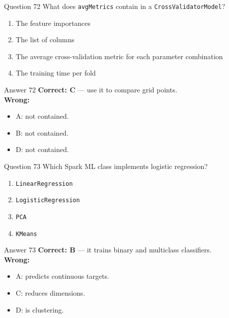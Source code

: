 \documentclass[aspectratio=169,11pt]{beamer}
\begin{document}
\begin{frame}{Question 72}
What does \texttt{avgMetrics} contain in a \texttt{CrossValidatorModel}?
\begin{enumerate}[label=\Alph*.]
\item The feature importances
\item The list of columns
\item The average cross-validation metric for each parameter combination
\item The training time per fold
\end{enumerate}
\end{frame}
\begin{frame}{Answer 72}
\textbf{Correct: C} --- use it to compare grid points.\\
\vspace{0.5em}
\textbf{Wrong:}
\begin{itemize}
\item A: not contained.
\item B: not contained.
\item D: not contained.
\end{itemize}
\end{frame}

\begin{frame}{Question 73}
Which Spark ML class implements logistic regression?
\begin{enumerate}[label=\Alph*.]
\item \texttt{LinearRegression}
\item \texttt{LogisticRegression}
\item \texttt{PCA}
\item \texttt{KMeans}
\end{enumerate}
\end{frame}
\begin{frame}{Answer 73}
\textbf{Correct: B} --- it trains binary and multiclass classifiers.\\
\vspace{0.5em}
\textbf{Wrong:}
\begin{itemize}
\item A: predicts continuous targets.
\item C: reduces dimensions.
\item D: is clustering.
\end{itemize}
\end{frame}
\end{document}
